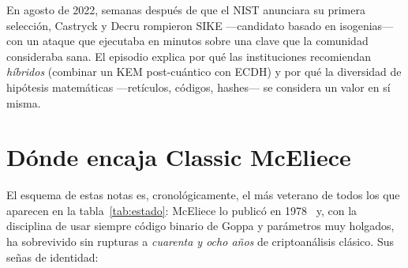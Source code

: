 \documentclass[11pt,a4paper,oneside]{report}
\begin{document}
\begin{historia}
En agosto de 2022, semanas después de que el NIST anunciara su primera
selección, Castryck y Decru rompieron SIKE ---candidato basado en
isogenias--- con un ataque que ejecutaba en minutos sobre una clave que la
comunidad consideraba sana. El episodio explica por qué las instituciones
recomiendan \emph{híbridos} (combinar un KEM post-cuántico con ECDH) y por
qué la diversidad de hipótesis matemáticas ---retículos, códigos,
hashes--- se considera un valor en sí misma.
\end{historia}

\section{Dónde encaja Classic McEliece}

El esquema de estas notas es, cronológicamente, el más veterano de todos los
que aparecen en la tabla~\ref{tab:estado}: McEliece lo publicó en
1978~\cite{mceliece1978} y, con la disciplina de usar siempre código
binario de Goppa y parámetros muy holgados, ha sobrevivido sin rupturas a
\emph{cuarenta y ocho años} de criptoanálisis clásico. Sus señas de
identidad:
\end{document}
